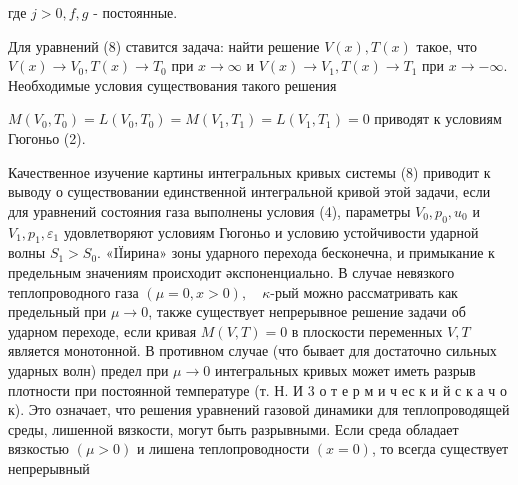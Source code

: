 \documentclass[10pt]{article}
\begin{document}
где $j>0, f, g$ - постоянные.



Для уравнений (8) ставится задача: найти решение $V(x), T(x)$ такое, что $V(x) \rightarrow V_{0}, T(x) \rightarrow T_{0}$ при $x \rightarrow \infty$ и $V(x) \rightarrow V_{1}, T(x) \rightarrow T_{1}$ при $x \rightarrow-\infty$. Необходимые условия существования такого решения



$M\left(V_{0}, T_{0}\right)=L\left(V_{0}, T_{0}\right)=M\left(V_{1}, T_{1}\right)=L\left(V_{1}, T_{1}\right)=0$ приводят к условиям Гюгоньо (2).



Качественное изучение картины интегральных кривых системы (8) приводит к выводу о существовании единственной интегральной кривой этой задачи, если для уравнений состояния газа выполнены условия (4), параметры $V_{0}, p_{0}, u_{0}$ и $V_{1}, p_{1}, \varepsilon_{1}$ удовлетворяют условиям Гюгоньо и условию устойчивости ударной волны $S_{1}>S_{0}$. «IÏирина» зоны ударного перехода бесконечна, и примыкание к предельным значениям происходит әкспоненциально. В случае невязкого теплопроводного газа $(\mu=0, x>0), \quad \kappa$-рый можно рассматривать как предельный при $\mu \rightarrow 0$, также существует непрерывное решение задачи об ударном переходе, если кривая $M(V, T)=0$ в плоскости переменных $V, T$ является монотонной. В противном случае (что бывает для достаточно сильных ударных волн) предел при $\mu \rightarrow 0$ интегральных кривых может иметь разрыв плотности при постоянной температуре (т. Н. И 3 о т е р м и ч ес к и й с к а ч о к). Это означает, что решения уравнений газовой динамики для теплопроводящей среды, лишенной вязкости, могут быть разрывными. Если среда обладает вязкостью $(\mu>0)$ и лишена теплопроводности $(x=0)$, то всегда существует непрерывный
\end{document}

